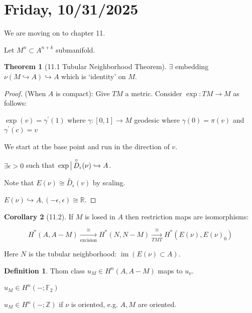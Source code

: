 \documentclass{article}
\theoremstyle{definition}
\newtheorem*{definition}{Definition}
\newtheorem{theorem}{Theorem}
\newtheorem{corollary}[theorem]{Corollary}
\begin{document}
    \section*{Friday, 10/31/2025}
    
    We are moving on to chapter 11.

    Let \(M^n \subset A^{n+k}\) submanifold.

    \begin{theorem}
        [11.1 Tubular Neighborhood Theorem]

        \(\exists\) embedding \(\nu(M \hookrightarrow A) \hookrightarrow A\) which is `identity' on \(M\).
    \end{theorem}

    \begin{proof}
        (When \(A\) is compact): Give \(TM\) a metric. Consider \(\exp : TM \to M\) as follows:

        \(\exp(v) = \gamma^{\prime}(1)\) where \(\gamma:[0,1] \to M\) geodesic where \(\gamma(0) = \pi(v)\) and \(\gamma^{\prime}(c) = v\) 

        We start at the base point and run in the direction of \(v\). 

        \(\exists \epsilon > 0\) such that \(\eval{\exp}\overset{\circ}{D}_{\epsilon}(\nu) \hookrightarrow A\).

        Note that \(E(\nu) \cong \overset{\circ}{D}_{\epsilon}(v)\) by scaling. 

        \(E(\nu) \hookrightarrow A, (-\epsilon, \epsilon) \cong \mathbb{R}\).

    \end{proof}

    \begin{corollary}
        [11.2] If \(M\) is losed in \(A\) then restriction maps are isomorphisms:

        \[
            H^{\ast}(A, A-M) \xrightarrow[\text{excision}]{\cong} H^{\ast}(N, N-M) \xrightarrow[TMT]{\cong} H^{\ast}(E(\nu), E(\nu)_0)
        \]

        Here \(N\) is the tubular neighborhood: \(\operatorname{im} (E(\nu) \subset A)\).

    \end{corollary}

    \begin{definition}
        Thom class \(u_M \in H^n(A, A-M)\) maps to \(u_\nu\).

        \(u_M \in H^n(-;\mathbb{F}_2)\)
        
        \(u_M \in H^n(-;\mathbb{Z})\) if \(\nu\) is oriented, e.g. \(A,M\) are oriented.
    \end{definition}
\end{document}
